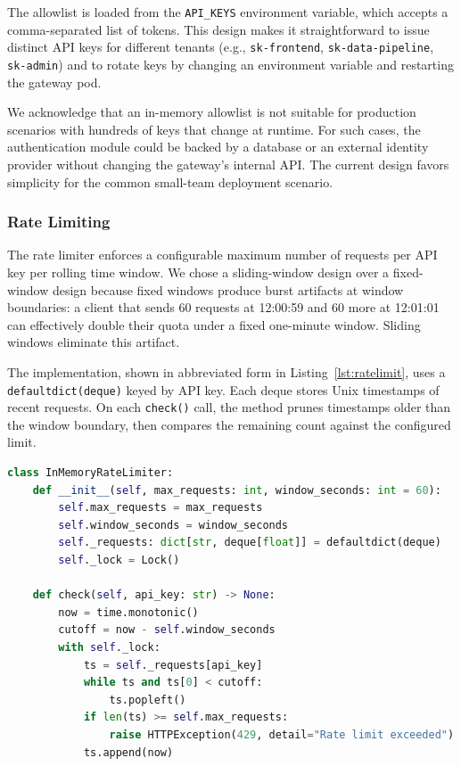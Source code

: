 \documentclass[10pt,journal]{IEEEtran}
\begin{document}
The allowlist is loaded from the \texttt{API\_KEYS} environment variable, which accepts a comma-separated list of tokens. This design makes it straightforward to issue distinct API keys for different tenants (e.g., \texttt{sk-frontend}, \texttt{sk-data-pipeline}, \texttt{sk-admin}) and to rotate keys by changing an environment variable and restarting the gateway pod.

We acknowledge that an in-memory allowlist is not suitable for production scenarios with hundreds of keys that change at runtime. For such cases, the authentication module could be backed by a database or an external identity provider without changing the gateway's internal API. The current design favors simplicity for the common small-team deployment scenario.

\subsubsection{Rate Limiting}

The rate limiter enforces a configurable maximum number of requests per API key per rolling time window. We chose a sliding-window design over a fixed-window design because fixed windows produce burst artifacts at window boundaries: a client that sends 60 requests at 12:00:59 and 60 more at 12:01:01 can effectively double their quota under a fixed one-minute window. Sliding windows eliminate this artifact.

The implementation, shown in abbreviated form in Listing~\ref{lst:ratelimit}, uses a \texttt{defaultdict(deque)} keyed by API key. Each deque stores Unix timestamps of recent requests. On each \texttt{check()} call, the method prunes timestamps older than the window boundary, then compares the remaining count against the configured limit.

\begin{lstlisting}[language=Python, caption={Sliding-window rate limiter (simplified from the actual implementation in \texttt{gateway/app/rate\_limit.py}).}, label={lst:ratelimit}]
class InMemoryRateLimiter:
    def __init__(self, max_requests: int, window_seconds: int = 60):
        self.max_requests = max_requests
        self.window_seconds = window_seconds
        self._requests: dict[str, deque[float]] = defaultdict(deque)
        self._lock = Lock()

    def check(self, api_key: str) -> None:
        now = time.monotonic()
        cutoff = now - self.window_seconds
        with self._lock:
            ts = self._requests[api_key]
            while ts and ts[0] < cutoff:
                ts.popleft()
            if len(ts) >= self.max_requests:
                raise HTTPException(429, detail="Rate limit exceeded")
            ts.append(now)
\end{lstlisting}
\end{document}
